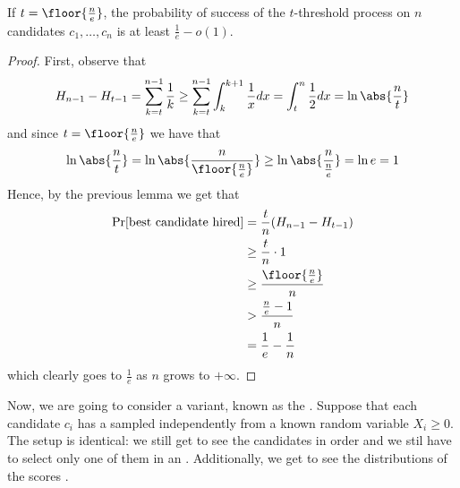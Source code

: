 \documentclass[a4paper, 12pt]{report}
\begin{document}
    \begin{framedthm}{}
        If $t = \floor{\tfrac{n}{e}}$, the probability of success of the $t$-threshold process on $n$ candidates $c_1, \ldots, c_n$ is at least $\tfrac{1}{e} - o(1)$.
    \end{framedthm}

    \begin{proof}
        First, observe that $$H_{n - 1} - H_{t - 1} = \sum_{k = t}^{n - 1}{\dfrac{1}{k}} \ge \sum_{k = t}^{n - 1}{\int_k^{k + 1}{\dfrac{1}{x}dx}} = \int_t^n{\dfrac{1}{2}dx = \ln \abs{\dfrac{n}{t}}}$$ and since $t = \floor{\tfrac{n}{e}}$ we have that $$\ln \abs{\dfrac{n}{t}} = \ln \abs{\dfrac{n}{\floor{\tfrac{n}{e}}}} \ge \ln \abs{\dfrac{n}{\tfrac{n}{e}}} = \ln e = 1$$ Hence, by the previous lemma we get that
        \begin{equation*}
            \begin{split}
                \Pr[\mbox{best candidate hired}] &= \dfrac{t}{n}(H_{n - 1} - H_{t - 1}) \\
                                                 &\ge \dfrac{t}{n} \cdot 1 \\
                                                 &\ge \dfrac{\floor{\tfrac{n}{e}}}{n} \\
                                                 &> \dfrac{\tfrac{n}{e} - 1}{n} \\
                                                 &= \dfrac{1}{e} - \dfrac{1}{n} \\
            \end{split}
        \end{equation*}
        which clearly goes to $\tfrac{1}{e}$ as $n$ grows to $+ \infty$.
    \end{proof}

    Now, we are going to consider a variant, known as the . Suppose that each candidate $c_i$ has a  sampled independently from a known random variable $X_i \ge 0$. The setup is identical: we still get to see the candidates in order and we stil have to select only one of them in an . Additionally, we get to see the distributions of the scores .
\end{document}
